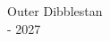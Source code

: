 \documentclass{article}
\begin{document}
\pagestyle{empty} %

\begin{center}
\vspace*{\fill}
\fontsize{70}{84}\selectfont %
Outer Dibblestan\\
\vspace{20pt}
\fontsize{36}{43} - 2027
\vfill
\end{center}
\end{document}
